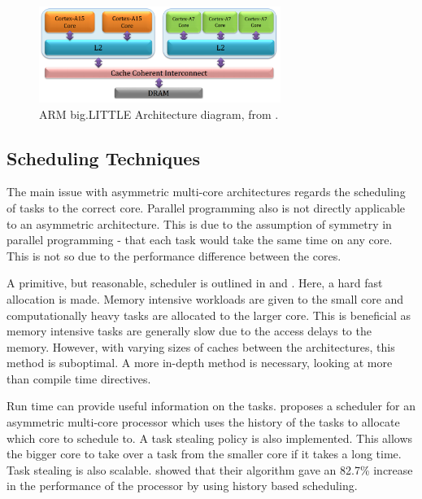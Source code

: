 \begin{figure}
\centering
\includegraphics[width=0.7\textwidth]{Figures/armbiglittle.png}
\caption{ARM big.LITTLE Architecture diagram, from \cite{muthukaruppan2013hierarchical}.}
\label{fig:bigLITTLE:arch}
\end{figure}


\subsection{Scheduling Techniques}

The main issue with asymmetric multi-core architectures regards the scheduling of tasks to the correct core.
Parallel programming also is not directly applicable to an asymmetric architecture. 
This is due to the assumption of symmetry in parallel programming - that each task would take the same time on any core. 
This is not so due to the performance difference between the cores.

A primitive, but reasonable, scheduler is outlined in \cite{esmaeilzadeh2011dark} and \cite{jimenez2009predictive}.
Here, a hard fast allocation is made. 
Memory intensive workloads are given to the small core and computationally heavy tasks are allocated to the larger core. 
This is beneficial as memory intensive tasks are generally slow due to the access delays to the memory. 
However, with varying sizes of caches between the architectures, this method is suboptimal. 
A more in-depth method is necessary, looking at more than compile time directives.



Run time can provide useful information on the tasks. 
\cite{chen2012wats} proposes a scheduler for an asymmetric multi-core processor which uses the history of the tasks to allocate which core to schedule to. %
A task stealing policy is also implemented. 
This allows the bigger core to take over a task from the smaller core if it takes a long time.
Task stealing is also scalable. 
\cite{chen2012wats} showed that their algorithm gave an 82.7\% increase in the performance of the processor by using history based scheduling.

